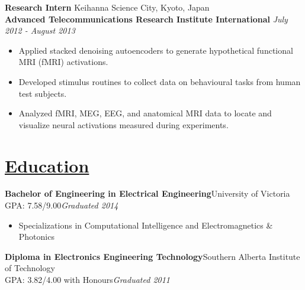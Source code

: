 \documentclass[a4paper, 11pt]{article}
\begin{document}
  \textbf{Research Intern} \hfill Keihanna Science City, Kyoto, Japan \\
  \textbf{Advanced Telecommunications Research Institute International} \hfill \emph{July 2012 - August 2013}\smallskip
  \begin{itemize}[nosep]
    \item Applied stacked denoising autoencoders to generate hypothetical functional MRI (fMRI) activations.
    \item Developed stimulus routines to collect data on behavioural tasks from human test subjects.
    \item Analyzed fMRI, MEG, EEG, and anatomical MRI data to locate and visualize neural activations measured during experiments.
  \end{itemize}

\section{\underline{Education}}
  \textbf{Bachelor of Engineering in Electrical Engineering}\hfill University of Victoria\\
  GPA: 7.58/9.00\hfill\emph{Graduated 2014}\smallskip
  \begin{itemize}[nosep]
    \item Specializations in Computational Intelligence and Electromagnetics \& Photonics
  \end{itemize}
  \medskip
  
  \textbf{Diploma in Electronics Engineering Technology}\hfill Southern Alberta Institute of Technology\\
  GPA: 3.82/4.00 with Honours\hfill\emph{Graduated 2011}\smallskip
  
\end{document}
